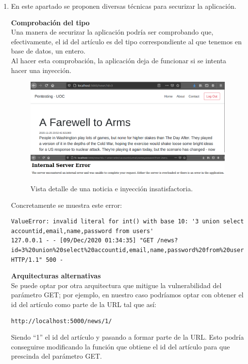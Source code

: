 \documentclass[a4paper,oneside]{article}
\begin{document}
\begin{enumerate}[label=\textbf{\alph*)}]
\item En este apartado se proponen diversas técnicas para securizar la aplicación.

\textbf{Comprobación del tipo}\\
Una manera de securizar la aplicación podría ser comprobando que, efectivamente, el id del artículo es del tipo correspondiente al que tenemos en base de datos, un entero.\\



Al hacer esta comprobación, la aplicación deja de funcionar si se intenta hacer una inyección.

\begin{figure}[h!]
  \centering
  \includegraphics[scale=0.4]{images/news2.png}\\
  \vspace{.5cm}
  \includegraphics[scale=0.3]{images/nok.png}
  \caption{Vista detalle de una noticia e inyección insatisfactoria.}
  \label{fig:news2}
\end{figure}

Concretamente se muestra este error:
\begin{lstlisting}
ValueError: invalid literal for int() with base 10: '3 union select accountid,email,name,password from users'
127.0.0.1 - - [09/Dec/2020 01:34:35] "GET /news?id=3%20union%20select%20accountid,email,name,password%20from%20users HTTP/1.1" 500 -
\end{lstlisting}

\textbf{Arquitecturas alternativas}\\
Se puede optar por otra arquitectura que mitigue la vulnerabilidad del parámetro GET; por ejemplo, en nuestro caso podríamos optar con obtener el id del artículo como parte de la URL tal que así:
\begin{lstlisting}
http://localhost:5000/news/1/
\end{lstlisting}
Siendo ``1'' el id del artículo y pasando a formar parte de la URL. Esto podría conseguirse modificando la función que obtiene el id del artículo para que prescinda del parámetro GET.\\


\end{enumerate}
\end{document}

